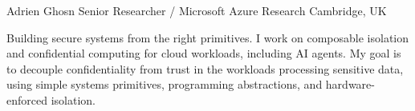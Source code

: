 \documentclass[10pt,a4paper]{article}
\begin{document}

\cvheader
  {Adrien Ghosn}
  {Senior Researcher / Microsoft Azure Research}
  {Cambridge, UK}
  {
   \cvcontactsep {}
   \cvcontactsep {}
   \cvcontactsep {}}

\cvsummary
  {Building secure systems from the right primitives.}
  {I work on composable isolation and confidential computing for cloud workloads,
   including AI agents. My goal is to decouple confidentiality from trust in the
   workloads processing sensitive data, using simple systems primitives,
   programming abstractions, and hardware-enforced isolation.}




\newpage
{}




\label{cv:lastpage}
\end{document}
